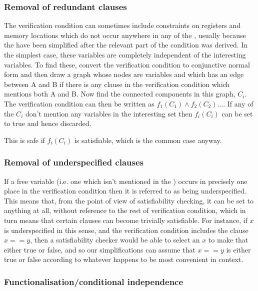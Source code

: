 \subsubsection{Removal of redundant clauses}
The verification condition can sometimes include constraints on registers and memory locations which do not occur anywhere in any of the \StateMachines, usually because the \StateMachines have been simplified after the relevant part of the condition was derived.
In the simplest case, these variables are completely independent of the interesting variables.
To find these, convert the verification condition to conjunctive normal form and then draw a graph whose nodes are variables and which has an edge between A and B if there is any clause in the verification condition which mentions both A and B.
Now find the connected components in this graph, $C_i$.
The verification condition can then be written as $f_1(C_1) \wedge f_2(C_2) \ldots$.
If any of the $C_i$ don't mention any variables in the interesting set then $f_i(C_i)$ can be set to true and hence discarded.

This is safe if $f_i(C_i)$ is satisfiable, which is the common case anyway.

\subsubsection{Removal of underspecified clauses}

If a free variable (i.e. one which isn't mentioned in the \StateMachines) occurs in precisely one place in the verification condition then it is referred to as being underspecified.
This means that, from the point of view of satisfiability checking, it can be set to anything at all, without reference to the rest of verification condition, which in turn means that certain clauses can become trivially satisfiable.
For instance, if $x$ is underspecified in this sense, and the verification condition includes the clause $x == y$, then a satisfiability checker would be able to select an $x$ to make that either true or false, and so our simplifications can assume that $x == y$ is either true or false according to whatever happens to be most convenient in context.

\subsubsection{Functionalisation/conditional independence}

